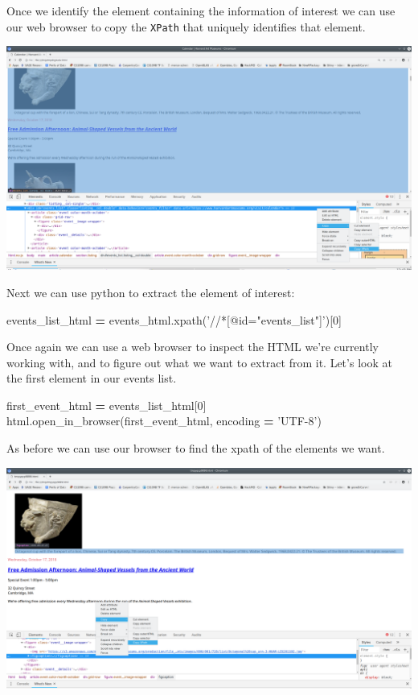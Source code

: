 \documentclass[]{book}
\newenvironment{Shaded}{\begin{snugshade}}{\end{snugshade}}
\newcommand{\DecValTok}[1]{\textcolor[rgb]{0.00,0.00,0.81}{#1}}
\newcommand{\NormalTok}[1]{#1}
\newcommand{\OperatorTok}[1]{\textcolor[rgb]{0.81,0.36,0.00}{\textbf{#1}}}
\newcommand{\StringTok}[1]{\textcolor[rgb]{0.31,0.60,0.02}{#1}}
\begin{document}
Once we identify the element containing the information of interest we
can use our web browser to copy the \texttt{XPath} that uniquely identifies
that element.

\includegraphics{Python/PythonWebScrape/images/dev_tools_xpath.png}

Next we can use python to extract the element of interest:

\begin{Shaded}
\begin{Highlighting}[]
\NormalTok{events_list_html }\OperatorTok{=}\NormalTok{ events_html.xpath(}\StringTok{'//*[@id="events_list"]'}\NormalTok{)[}\DecValTok{0}\NormalTok{]}
\end{Highlighting}
\end{Shaded}

Once again we can use a web browser to inspect the HTML we're
currently working with, and to figure out what we want to extract from
it. Let's look at the first element in our events list.

\begin{Shaded}
\begin{Highlighting}[]
\NormalTok{first_event_html }\OperatorTok{=}\NormalTok{ events_list_html[}\DecValTok{0}\NormalTok{]}
\NormalTok{html.open_in_browser(first_event_html, encoding }\OperatorTok{=} \StringTok{'UTF-8'}\NormalTok{)}
\end{Highlighting}
\end{Shaded}

As before we can use our browser to find the xpath of the elements we
want.

\includegraphics{Python/PythonWebScrape/images/dev_tools_figcaption.png}
\end{document}
